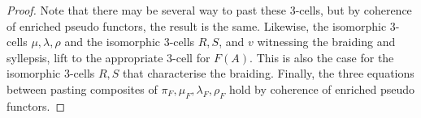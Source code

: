\begin{proof}

 Note that there may be several way to past these 3-cells, but by coherence of enriched pseudo functors, the result is the same. Likewise, the isomorphic 3-cells $\mu, \lambda,\rho$ and the isomorphic 3-cells $R,S$, and $v$ witnessing the braiding and syllepsis, lift to the appropriate 3-cell for $F(A)$. This is also the case for the isomorphic 3-cells $R,S$ that characterise the braiding. 
   Finally,  the three equations between pasting composites of $\pi_{F}, \mu_{F}, \lambda_{F}, \rho_{F}$ hold by coherence of enriched pseudo functors.


        

\end{proof}
